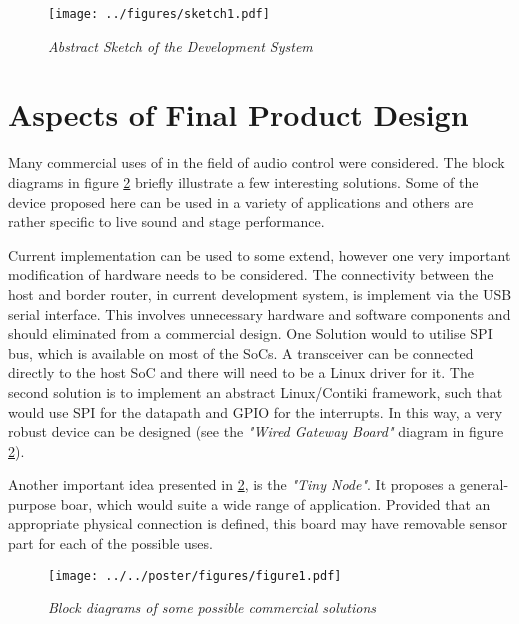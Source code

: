 \begin{figure}
\centering
\texttt{[image: ../figures/sketch1.pdf]}
\caption{\emph{Abstract Sketch of the Development System}} \label{fig:sketch1}
\end{figure}


\pagebreak
\section{Aspects of Final Product Design}

   Many commercial uses of \WPAN in the field of audio control were
 considered. The block diagrams in figure \ref{fig:products} briefly
 illustrate a few interesting solutions. Some of the device proposed
 here can be used in a variety of applications and others are rather
 specific to live sound and stage performance.

  Current implementation can be used to some extend, however one
 very important modification of hardware needs to be considered.
 The connectivity between the host and border router, in current
 development system, is implement via the USB serial interface.
 This involves unnecessary hardware and software components and
 should eliminated from a commercial design.
  One Solution would to utilise SPI bus, which is available on
 most of the SoCs. A transceiver can be connected directly to
 the host SoC and there will need to be a Linux driver for it.
 The second solution is to implement an abstract Linux/Contiki
 framework, such that would use SPI for the datapath and GPIO
 for the interrupts. In this way, a very robust device can be
 designed (see the \emph{"Wired Gateway Board"} diagram in figure
 \ref{fig:products}).

  Another important idea presented in \ref{fig:products}, is the
 \emph{"Tiny Node"}. It proposes a general-purpose boar, which
 would suite a wide range of application. Provided that an
 appropriate physical connection is defined, this board may
 have removable sensor part for each of the possible uses.

\begin{figure}
\centering
\texttt{[image: ../../poster/figures/figure1.pdf]}
\caption{\emph{Block diagrams of some possible commercial solutions}} \label{fig:products}
\end{figure}
